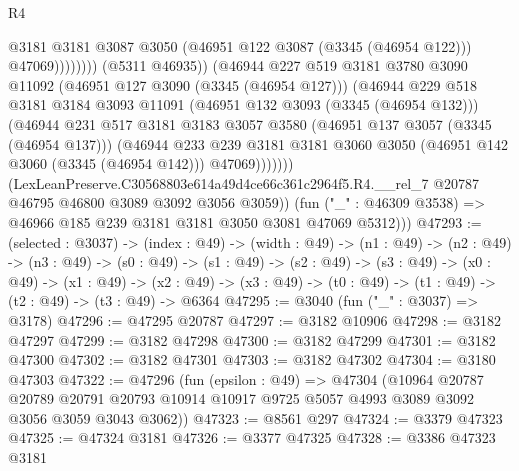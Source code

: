 \begin{lexlean}{R4}
\begin{coremodule}
                                  @3181
                                  @3181
                                  @3087
                                  @3050
                                  (@46951 @122 @3087 (@3345 (@46954 @122)))
                                  @47069))))))))
                  (@5311 @46935))
                (@46944
                  @227
                  @519
                  @3181
                  @3780
                  @3090
                  @11092
                  (@46951 @127 @3090 (@3345 (@46954 @127)))
                  (@46944
                    @229
                    @518
                    @3181
                    @3184
                    @3093
                    @11091
                    (@46951 @132 @3093 (@3345 (@46954 @132)))
                    (@46944
                      @231
                      @517
                      @3181
                      @3183
                      @3057
                      @3580
                      (@46951 @137 @3057 (@3345 (@46954 @137)))
                      (@46944
                        @233
                        @239
                        @3181
                        @3181
                        @3060
                        @3050
                        (@46951 @142 @3060 (@3345 (@46954 @142)))
                        @47069)))))))
          (LexLeanPreserve.C30568803e614a49d4ce66c361c2964f5.R4.__rel_7
            @20787
            @46795
            @46800
            @3089
            @3092
            @3056
            @3059))
        (fun ("_" : @46309 @3538) => @46966 @185 @239 @3181 @3181 @3050 @3081 @47069 @5312)))
@47293 := (selected : @3037) ->
  (index : @49) ->
  (width : @49) ->
  (n1 : @49) ->
  (n2 : @49) ->
  (n3 : @49) ->
  (s0 : @49) ->
  (s1 : @49) ->
  (s2 : @49) ->
  (s3 : @49) ->
  (x0 : @49) ->
  (x1 : @49) ->
  (x2 : @49) -> (x3 : @49) -> (t0 : @49) -> (t1 : @49) -> (t2 : @49) -> (t3 : @49) -> @6364
@47295 := @3040 (fun ("_" : @3037) => @3178)
@47296 := @47295 @20787
@47297 := @3182 @10906
@47298 := @3182 @47297
@47299 := @3182 @47298
@47300 := @3182 @47299
@47301 := @3182 @47300
@47302 := @3182 @47301
@47303 := @3182 @47302
@47304 := @3180 @47303
@47322 := @47296
    (fun (epsilon : @49) =>
    @47304
      (@10964
        @20787
        @20789
        @20791
        @20793
        @10914
        @10917
        @9725
        @5057
        @4993
        @3089
        @3092
        @3056
        @3059
        @3043
        @3062))
@47323 := @8561 @297
@47324 := @3379 @47323
@47325 := @47324 @3181
@47326 := @3377 @47325
@47328 := @3386 @47323 @3181

\end{coremodule}
\end{lexlean}
